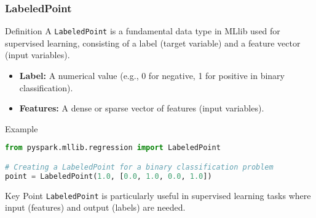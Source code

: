 \documentclass[aspectratio=169]{beamer}
\begin{document}
\begin{frame}[fragile]
    \frametitle{LabeledPoint}
    \begin{block}{Definition}
        A \texttt{LabeledPoint} is a fundamental data type in MLlib used for supervised learning, consisting of a label (target variable) and a feature vector (input variables).
    \end{block}
    
    \begin{itemize}
        \item \textbf{Label:} A numerical value (e.g., 0 for negative, 1 for positive in binary classification).
        \item \textbf{Features:} A dense or sparse vector of features (input variables).
    \end{itemize}

    \begin{block}{Example}
    \begin{lstlisting}[language=Python]
from pyspark.mllib.regression import LabeledPoint

# Creating a LabeledPoint for a binary classification problem
point = LabeledPoint(1.0, [0.0, 1.0, 0.0, 1.0])
    \end{lstlisting}
    \end{block}
    
    \begin{block}{Key Point}
        \texttt{LabeledPoint} is particularly useful in supervised learning tasks where input (features) and output (labels) are needed.
    \end{block}
\end{frame}
\end{document}
